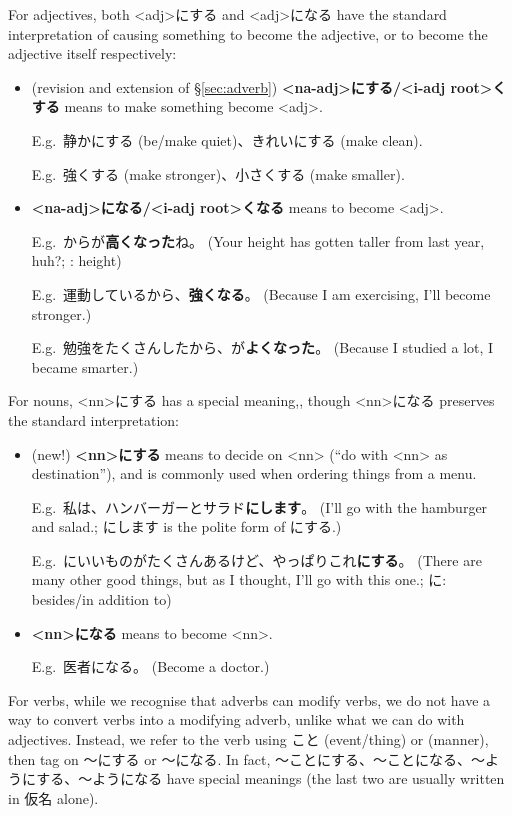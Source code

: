 \documentclass[../nihongo-gakushuu-kyouzai-grammar.tex]{subfiles}
\begin{document}
For adjectives, both <adj>にする and <adj>になる have the standard interpretation of causing something to become the adjective, or to become the adjective itself respectively:
\begin{itemize}
    \item (revision and extension of \S\ref{sec:adverb}) \textbf{<na-adj>にする/<i-adj root>くする} means to make something become <adj>.

    E.g.\ 静かにする (be/make quiet)、きれいにする (make clean).

    E.g.\ 強くする (make stronger)、小さくする (make smaller).
    \item \textbf{<na-adj>になる/<i-adj root>くなる} means to become <adj>.

    E.g.\ からが\textbf{高くなった}ね。 (Your height has gotten taller from last year, huh?; : height)

    E.g.\ 運動しているから、\textbf{強くなる}。 (Because I am exercising, I'll become stronger.)

    E.g.\ 勉強をたくさんしたから、が\textbf{よくなった}。 (Because I studied a lot, I became smarter.)
\end{itemize}

For nouns, <nn>にする has a special meaning,, though <nn>になる preserves the standard interpretation:
\begin{itemize}
    \item (new!) \textbf{<nn>にする} means to decide on <nn> (``do with <nn> as destination''), and is commonly used when ordering things from a menu.

    E.g.\ 私は、ハンバーガーとサラド\textbf{にします}。 (I'll go with the hamburger and salad.; にします is the polite form of にする.)

    E.g.\ にいいものがたくさんあるけど、やっぱりこれ\textbf{にする}。 (There are many other good things, but as I thought, I'll go with this one.; に: besides/in addition to)
    \item \textbf{<nn>になる} means to become <nn>.

    E.g.\ 医者になる。 (Become a doctor.)
\end{itemize}

For verbs, while we recognise that adverbs can modify verbs, we do not have a way to convert verbs into a modifying adverb, unlike what we can do with adjectives. Instead, we refer to the verb using こと (event/thing) or  (manner), then tag on 〜にする or 〜になる. In fact, 〜ことにする、〜ことになる、〜ようにする、〜ようになる have special meanings (the last two are usually written in 仮名 alone).
\end{document}
